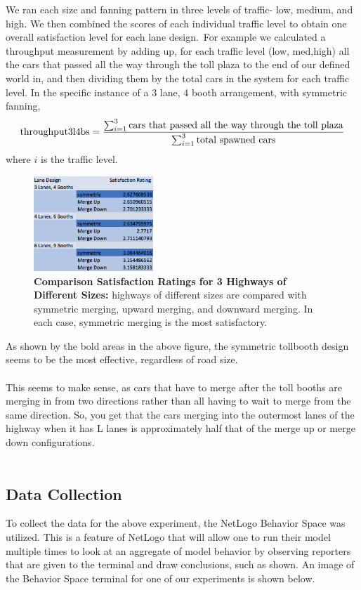 \documentclass{article}
\begin{document}
We ran each size and fanning pattern in three levels of traffic- low, medium, and high. We then combined the scores of each individual traffic level to obtain one overall satisfaction level for each lane design.\
For example we calculated a throughput measurement by adding up, for each traffic level (low, med,high) all the cars that passed all the way  through the toll plaza to the end of our defined world in, and then dividing them by the total cars in the system for each traffic level. In the specific instance of a 3 lane, 4 booth arrangement, with symmetric fanning, \\
\begin{equation}
 \centering
\text{throughput{3l4bs}} = \frac{\sum_{i=1}^{3}\text{cars that passed all the way through the toll plaza}}{\sum_{i=1}^{3}\text{total spawned cars}}
\end{equation}
where $i$ is the traffic level.
\begin{figure}[H]
    \centering
    \includegraphics[width=0.4\textwidth]{3ROADRESULT.png}
    \caption{\textbf{Comparison Satisfaction Ratings for 3 Highways of Different Sizes:} highways of different sizes are compared with symmetric merging, upward merging, and downward merging. In each case, symmetric merging is the most satisfactory.}
\end{figure}

As shown by the bold areas in the above figure, the symmetric tollbooth design seems to be the most effective, regardless of road size. \\ \\
This seems to make sense, as cars that have to merge after the toll booths are merging in from two directions rather than all having to wait to merge from the same direction. So, you get that the cars merging into the outermost lanes of the highway when it has L lanes is approximately half that of the merge up or merge down configurations. \\ \\


\subsection{Data Collection}
To collect the data for the above experiment, the NetLogo Behavior Space was utilized. This is a feature of NetLogo that will allow one to run their model multiple times to look at an aggregate of model behavior by observing reporters that are given to the terminal and draw conclusions, such as shown. An image of the Behavior Space terminal for one of our experiments is shown below.
\end{document}
